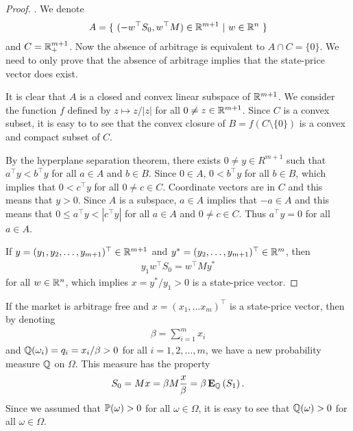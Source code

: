 \begin{proof}
 \textcite[p. 4]{duffie2010dynamic}. We denote
  \begin{align}
    A = \{ \ (-w^{\top} S_0, w^{\top} M ) \in \mathbb{R}^{m+1} \ | \ w \in \mathbb{R}^n \ \}
  \end{align}
and $C = \mathbb{R}_+^{m+1}$. Now the absence of arbitrage is equivalent to $A \cap C = \{ 0 \}$. We need to only prove that the absence of arbitrage implies that the state-price vector does exist.

It is clear that $A$ is a closed and convex linear subspace of $\mathbb{R}^{m+1}$. We consider the function $f$ defined by $z \mapsto z / \left| z \right|$ for all $0 \not = z \in \mathbb{R}^{m+1}$. Since $C$ is a convex subset, it is easy to to see that the convex closure of $B = f(C \setminus \{ 0 \})$ is a convex and compact subset of $C$. 

By the hyperplane separation theorem, there exists $0 \not = y \in R^{m+1}$ such that $a^{\top} y < b^{\top} y$ for all $a \in A$ and $b \in B$. Since $0 \in A$, $0 < b^{\top} y$ for all $b \in B$, which implies that $0 < c^{\top} y$ for all $0 \not = c \in C$. Coordinate vectors are in $C$ and this means that $y > 0$. Since $A$ is a subspace, $a \in A$ implies that $-a \in A$ and this means that $0 \leq a^{\top} y < \left| c^{\top} y \right|$ for all $a \in A$ and $0 \not = c \in C$. Thus $a^{\top} y = 0 $ for all $a \in A$.

If $y = (y_1, y_2, \ldots , y_{m+1})^{\top} \in \mathbb{R}^{m+1}$ and $y^* = (y_2, \ldots , y_{m+1})^{\top} \in \mathbb{R}^{m}$, then
  \begin{align}
    y_1 w^{\top} S_0 = w^{\top} M y^*
  \end{align}
for all $w \in \mathbb{R}^n$, which implies $x = y^* / y_1 > 0$ is a state-price vector.
\end{proof}

If the market is arbitrage free and $x = (x_1, \ldots x_m)^{\top}$ is a state-price vector, then by denoting 
  \begin{align}
    \beta = \sum_{i=1}^m x_i
  \end{align}
and $\mathbb{Q} (\omega_i) = q_i = x_i / \beta > 0$ for all $i = 1,2, \ldots ,m$, we have a new probability measure $\mathbb{Q}$ on $\Omega$. This measure has the property
  \begin{align}
    \label{martingalemeasureequationdiscrete}
    S_0 = M x = \beta M \frac{x}{\beta} = \beta \operatorname{\boldsymbol{\mathrm{E}}}_{\mathbb{Q}} \left( S_1 \right) .
  \end{align}
Since we assumed that $\mathbb{P} (\omega) > 0$ for all $\omega \in \Omega$, it is easy to see that $\mathbb{Q} (\omega) > 0$ for all $\omega \in \Omega$.
  
